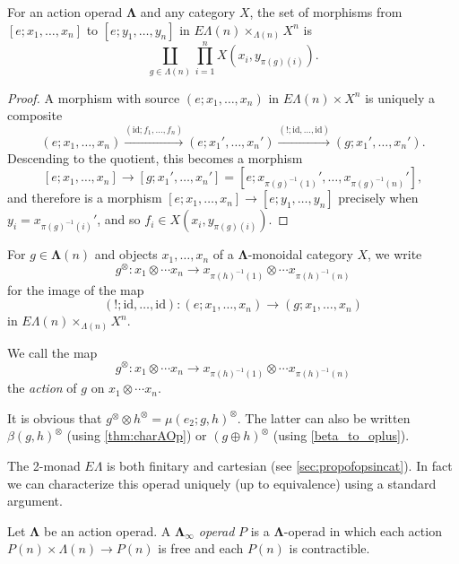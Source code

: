 \documentclass{amsbook} %
\newcommand{\mb}{\mathbf}
\newcommand{\id}{\textrm{id}}
\newcommand{\ML}{\mathbf{\Lambda}}
\numberwithin{section}{chapter}
\begin{document}
\begin{lem}\label{hom-set-lemma}
For an action operad $\mb{\Lambda}$ and any category $X$, the set of morphisms from $[e; x_1, \ldots, x_n]$ to $[e; y_1, \ldots, y_n]$ in $E\Lambda(n) \times_{\Lambda(n)} X^{n}$ is
\[
\coprod_{g \in \Lambda(n)} \prod_{i=1}^{n} X(x_i, y_{\pi(g)(i)}).
\]
\end{lem}
\begin{proof}
A morphism with source $(e; x_1, \ldots, x_n)$ in $E\Lambda(n) \times X^{n}$ is uniquely a composite
\[
(e; x_1, \ldots, x_n) \stackrel{(\id; f_{1}, \ldots, f_{n})}{\longrightarrow} (e; x_1', \ldots, x_n') \stackrel{(!; \id, \ldots, \id)}{\longrightarrow} (g; x_1', \ldots, x_n').
\]
Descending to the quotient, this becomes a morphism
\[
[e; x_1, \ldots, x_n] \to [g; x_1', \ldots, x_n'] = [e; x_{\pi(g)^{-1}(1)}', \ldots, x_{\pi(g)^{-1}(n)}'],
\]
and therefore is a morphism $[e; x_1, \ldots, x_n] \to [e; y_1, \ldots, y_n]$ precisely when $y_i = x_{\pi(g)^{-1}(i)}'$, and so $f_i \in   X(x_i, y_{\pi(g)(i)})$.
\end{proof}

\begin{nota}\label{tensor_notation}
For $g \in \ML(n)$ and objects $x_1, \ldots, x_n$ of a $\ML$-monoidal category $X$, we write 
\[
g^{\otimes} \colon x_1 \otimes \cdots x_n \to x_{\pi(h)^{-1}(1)} \otimes \cdots x_{\pi(h)^{-1}(n)}
\]
for the image of the map
\[
(!; \id, \ldots, \id) \colon  (e; x_1, \ldots, x_n) \to (g; x_1, \ldots, x_n)
\]
in $E\Lambda(n) \times_{\Lambda(n)} X^{n}$.
\end{nota}

\begin{Defi}\label{action_map}
We call the map 
\[
g^{\otimes} \colon x_1 \otimes \cdots x_n \to x_{\pi(h)^{-1}(1)} \otimes \cdots x_{\pi(h)^{-1}(n)}
\]
the \emph{action} of $g$ on $x_1 \otimes \cdots x_n$.
\end{Defi}

\begin{rem}
It is obvious that $g^{\otimes} \otimes h^{\otimes} = \mu(e_2; g, h)^{\otimes}$. The latter can also be written $\beta(g, h)^{\otimes}$ (using \cref{thm:charAOp}) or $(g \oplus h)^{\otimes}$  (using \cref{beta_to_oplus}).
\end{rem}

The 2-monad $E\Lambda$ is both finitary and cartesian (see \cref{sec:propofopsincat}).  In fact we can characterize this operad uniquely (up to equivalence) using a standard argument.

\begin{Defi}
Let $\mb{\Lambda}$ be an action operad.  A \textit{$\mb{\Lambda}_{\infty}$ operad} $P$ is a $\mb{\Lambda}$-operad in which each action $P(n) \times \Lambda(n) \rightarrow P(n)$ is free and each $P(n)$ is contractible.
\end{Defi}
\end{document}
